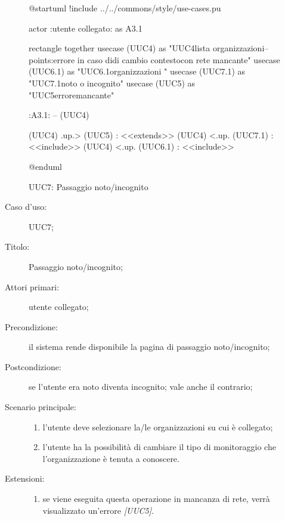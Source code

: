 \documentclass[../../../analisi-dei-requisiti.tex]{subfiles}
\begin{document}
\begin{figure}[H]
  \centering
  \begin{plantuml}
  @startuml
  !include ../../commons/style/use-cases.pu

  actor :utente collegato: as A3.1

  rectangle {
    together {
      usecase (UUC4) as "UUC4\nRecupero lista organizzazioni\n--\nExtension points:\nVisualizzazione errore in caso di\noperazione di cambio contesto\n con rete mancante"
      usecase (UUC6.1) as "UUC6.1\nFiltra organizzazioni \ncollegato"
      usecase (UUC7.1) as "UUC7.1\nScelta noto o incognito"
      usecase (UUC5) as "UUC5\nVisualizzazione errore\nrete mancante"
    }
  }

  :A3.1: -- (UUC4)

  (UUC4) .up.> (UUC5) : <<extends>>
  (UUC4) <.up. (UUC7.1) : <<include>>
  (UUC4) <.up. (UUC6.1) : <<include>>


  @enduml
  \end{plantuml}
  \caption{UUC7: Passaggio noto/incognito}%
  \label{fig:uuc7}
\end{figure}

\begin{description}
  \item[Caso d’uso:] UUC7;
  \item[Titolo:] Passaggio noto/incognito;
  \item[Attori primari:] utente collegato;
  \item[Precondizione:] il sistema rende disponibile la pagina di passaggio noto/incognito;
  \item[Postcondizione:] se l'utente era noto diventa incognito; vale anche il contrario;
  \item[Scenario principale:]
        \begin{enumerate}
          \item l'utente deve selezionare la/le organizzazioni su cui è collegato;
          \item l'utente ha la possibilità di cambiare il tipo di monitoraggio che l'organizzazione è tenuta a conoscere.
        \end{enumerate}
  \item[Estensioni:]
        \begin{enumerate}
          \item se viene eseguita questa operazione in mancanza di rete, verrà visualizzato un'errore \emph{[UUC5]}.
        \end{enumerate}
\end{description}
\end{document}
